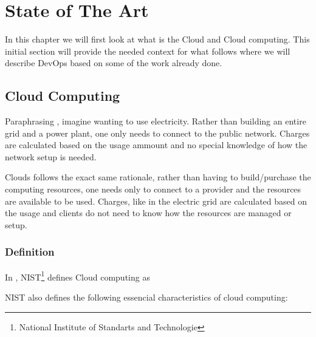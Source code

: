 \chapter{State of The Art} \label{chap:stateoftheart}
  In this chapter we will first look at what is the Cloud and Cloud computing. This initial section will provide the needed context for what follows where we will describe DevOps based on some of the work already done.

    \section{Cloud Computing} \label{chap:stateoftheart:sec:cloud}

        Paraphrasing \cite{Debois2008}, imagine wanting to use electricity. Rather than building an entire grid and a power plant, one only needs to connect to the public network. Charges are calculated based on the usage ammount and no special knowledge of how the network setup is needed.

        Clouds follows the exact same rationale, rather than having to build/purchase the computing resources, one needs only to connect to a provider and the resources are available to be used. Charges, like in the electric grid are calculated based on the usage and clients do not need to know how the resources are managed or setup.

        \subsection{Definition}
        In \cite{Mell2011}, NIST\footnote{National Institute of Standarts and Technologie} defines Cloud computing as 

        NIST also defines the following essencial characteristics of cloud computing:

